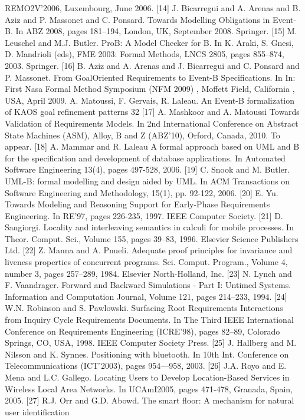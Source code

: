 REMO2V’2006, Luxembourg, June 2006.
[14] J. Bicarregui and A. Arenas and B. Aziz and P. Massonet and C. Ponsard. Towards
Modelling Obligations in Event-B. In ABZ 2008, pages 181–194, London, UK, September
2008. Springer.
[15] M. Leuschel and M.J. Butler. ProB: A Model Checker for B. In K. Araki, S. Gnesi,
D. Mandrioli (eds), FME 2003: Formal Methods, LNCS 2805, pages 855–874, 2003.
Springer.
[16] B. Aziz and A. Arenas and J. Bicarregui and C. Ponsard and P. Massonet. From GoalOriented Requirements to Event-B Specifications. In In: First Nasa Formal Method
Symposium (NFM 2009) , Moffett Field, California , USA, April 2009.
A. Matoussi, F. Gervais, R. Laleau. An Event-B formalization of KAOS goal refinement patterns 32
[17] A. Mashkoor and A. Matoussi Towards Validation of Requirements Models. In 2nd
International Conference on Abstract State Machines (ASM), Alloy, B and Z (ABZ’10),
Orford, Canada, 2010. To appear.
[18] A. Mammar and R. Laleau A formal approach based on UML and B for the specification
and development of database applications. In Automated Software Engineering 13(4),
pages 497-528, 2006.
[19] C. Snook and M. Butler. UML-B: formal modelling and design aided by UML. In ACM
Transactions on Software Engineering and Methodology, 15(1), pp. 92-122, 2006.
[20] E. Yu. Towards Modeling and Reasoning Support for Early-Phase Requirements Engineering. In RE’97, pages 226-235, 1997. IEEE Computer Society.
[21] D. Sangiorgi. Locality and interleaving semantics in calculi for mobile processes. In
Theor. Comput. Sci., Volume 155, pages 39–83, 1996. Elsevier Science Publishers Ltd.
[22] Z. Manna and A. Pnueli. Adequate proof principles for invariance and liveness properties
of concurrent programs. Sci. Comput. Program., Volume 4, number 3, pages 257–289,
1984. Elsevier North-Holland, Inc.
[23] N. Lynch and F. Vaandrager. Forward and Backward Simulations - Part I: Untimed
Systems. Information and Computation Journal, Volume 121, pages 214–233, 1994.
[24] W.N. Robinson and S. Pawlowski. Surfacing Root Requirements Interactions from Inquiry Cycle Requirements Documents. In The Third IEEE International Conference on
Requirements Engineering (ICRE’98), pages 82–89, Colorado Springs, CO, USA, 1998.
IEEE Computer Society Press.
[25] J. Hallberg and M. Nilsson and K. Synnes. Positioning with bluetooth. In 10th Int.
Conference on Telecommunications (ICT’2003), pages 954—958, 2003.
[26] J.A. Royo and E. Mena and L.C. Gallego. Locating Users to Develop Location-Based
Services in Wireless Local Area Networks. In UCAmI2005, pages 471-478, Granada,
Spain, 2005.
[27] R.J. Orr and G.D. Abowd. The smart floor: A mechanism for natural user identification
